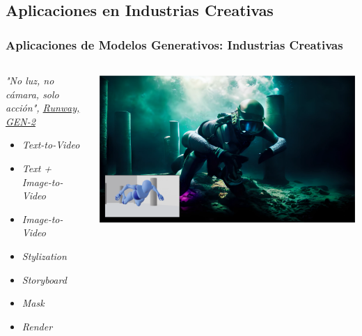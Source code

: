 \documentclass[9pt]{beamer}
\begin{document}
\subsection{Aplicaciones en Industrias Creativas}
\begin{frame}
\frametitle{Aplicaciones de Modelos Generativos: Industrias Creativas}

\begin{columns}
\begin{column}{0.5\textwidth}
\textit{"No luz, no cámara, solo acción", \href{https://research.runwayml.com/gen2}{Runway, GEN-2}}
  \begin{itemize}
    \item \textit{Text-to-Video}
    \item \textit{Text + Image-to-Video}
    \item \textit{Image-to-Video}
    \item \textit{Stylization}
    \item \textit{Storyboard}
    \item \textit{Mask}
    \item \textit{Render}
  \end{itemize}
\end{column}
\begin{column}{0.5\textwidth}
  \includegraphics[width=\textwidth]{diapositivas/img/runaway-gen2-render.png}
\end{column}
\end{columns}
\end{frame}

\begin{frame}
  \titlepage
\end{frame}


% 
\end{document}
